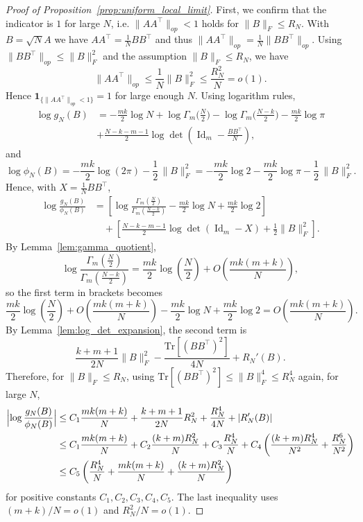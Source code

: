 \documentclass[10pt,a4paper]{amsart}
\begin{document}
	\begin{proof}[Proof of Proposition~\ref{prop:uniform_local_limit}]
		First, we confirm that the indicator is $1$ for large $N$, i.e. \(\|AA^\top \|_{op}<1\) holds for \(\|B\|_F \le R_N\). With $B = \sqrt{N}A$ we have \(AA^\top = \frac{1}{N}BB^\top\) and thus \(\|AA^\top\|_{op} = \frac{1}{N}\|BB^\top\|_{op}\).  Using \(\|BB^\top\|_{op} \le \|B\|_F^2\) and the assumption \(\|B\|_F \le R_N\), we have
		\[ \|AA^\top\|_{op} \le \frac{1}{N} \|B\|_F^2 \le \frac{R_N^2}{N} = o(1). \]
		Hence \(\mathbf1_{\{\|AA^\top\|_{op}<1\}} = 1\) for large enough \(N\). Using logarithm rules, 
		\begin{align*}
		 \log g_N(B) &= -\frac{mk}{2}\log N + \log\Gamma_m\bigl(\frac N2\bigr) - \log\Gamma_m\bigl(\frac{N-k}2\bigr) - \frac{mk}{2}\log\pi\\
		 & + \frac{N-k-m-1}2\log\det(\operatorname{Id}_m - \frac{BB^\top}N), 
		\end{align*}
		and
		$$ \log\phi_{N}(B) = -\frac{mk}{2}\log(2\pi) - \frac12\,\|B\|_F^2 = -\frac{mk}{2}\log 2 - \frac{mk}{2}\log\pi - \frac12\,\|B\|_F^2. $$
		Hence, with \(X=\frac1N BB^\top\),
		\begin{align*} \log\frac{g_N(B)}{\phi_{N}(B)} &= \left[ \log\frac{\Gamma_m(\frac N2)}{\Gamma_m(\frac{N-k}2)} - \frac{mk}{2}\log N + \frac{mk}{2}\log 2 \right]  \\ & \quad + \left[ \frac{N-k-m-1}{2}\log\det(\operatorname{Id}_m-X) + \frac12\|B\|_F^2 \right].
		\end{align*}
		By Lemma~\ref{lem:gamma_quotient},
		$$ \log\frac{\Gamma_m(\frac N2)}{\Gamma_m(\frac{N-k}2)} = \frac{mk}{2}\log(\frac N2) + O\left(\frac{mk(m+k)}{N}\right), $$
		so the first term in brackets becomes
		$$ \frac{mk}{2}\log(\frac N2) + O\left(\frac{mk(m+k)}{N}\right) - \frac{mk}{2}\log N + \frac{mk}{2}\log 2 = O\left(\frac{mk(m+k)}{N}\right). $$
		By Lemma~\ref{lem:log_det_expansion}, the second term is
		$$ \frac{k+m+1}{2N}\|B\|_F^2 - \frac{\mathrm{Tr}[(BB^\top)^2]}{4N} + R_N'(B). $$
		Therefore, for \(\|B\|_F\le R_N\), using \(\mathrm{Tr}[(BB^\top)^2] \le \|B\|_F^4 \le R_N^4\) again, for large $N$,
		\begin{align*} 
		\Bigl|\log\frac{g_N(B)}{\phi_{N}(B)}\Bigr| &\le C_1\frac{mk(m+k)}{N} + \frac{k+m+1}{2N}R_N^2 + \frac{R_N^4}{4N} + |R_N'(B)|\\
		& \le C_1\frac{mk(m+k)}{N} + C_2\frac{(k+m)R_N^2}{N} + C_3\frac{R_N^4}{N} + C_4\left(\frac{(k+m)R_N^4}{N^2} + \frac{R_N^6}{N^2}\right)\\
		& \le C_5\left(\frac{R_N^4}{N} + \frac{mk(m+k)}{N} + \frac{(k+m)R_N^2}{N}\right)
		\end{align*}
		for positive constants \(C_1, C_2, C_3, C_4, C_5\). The last inequality uses $(m+k)/N=o(1)$ and $R_N^2/N=o(1)$. 
		\end{proof}
\end{document}

